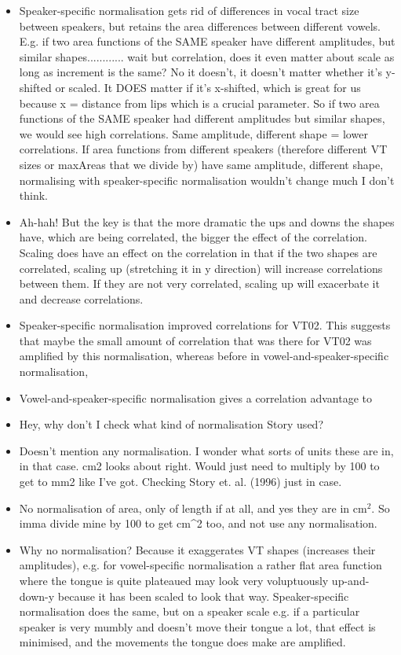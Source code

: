 \documentclass{article}
\begin{document}
\begin{itemize}
\begin{itemize}
\begin{itemize}
\begin{itemize}
                \item Speaker-specific normalisation gets rid of differences in vocal tract size between speakers, but retains the area differences between different vowels. E.g. if two area functions of the SAME speaker have different amplitudes, but similar shapes............ wait but correlation, does it even matter about scale as long as increment is the same? No it doesn't, it doesn't matter whether it's y-shifted or scaled. It DOES matter if it's x-shifted, which is great for us because x = distance from lips which is a crucial parameter. So if two area functions of the SAME speaker had different amplitudes but similar shapes, we would see high correlations. Same amplitude, different shape = lower correlations. If area functions from different speakers (therefore different VT sizes or maxAreas that we divide by) have same amplitude, different shape, normalising with speaker-specific normalisation wouldn't change much I don't think.
                \item Ah-hah! But the key is that the more dramatic the ups and downs the shapes have, which are being correlated, the bigger the effect of the correlation. Scaling does have an effect on the correlation in that if the two shapes are correlated, scaling up (stretching it in y direction) will increase correlations between them. If they are not very correlated, scaling up will exacerbate it and decrease correlations.
                \item Speaker-specific normalisation improved correlations for VT02. This suggests that maybe the small amount of correlation that was there for VT02 was amplified by this normalisation, whereas before in vowel-and-speaker-specific normalisation, 
                \item Vowel-and-speaker-specific normalisation gives a correlation advantage to 
                \item Hey, why don't I check what kind of normalisation Story used?
                \item Doesn't mention any normalisation. I wonder what sorts of units these are in, in that case. cm2 looks about right. Would just need to multiply by 100 to get to mm2 like I've got. Checking Story et. al. (1996) just in case. 
                \item No normalisation of area, only of length if at all, and yes they are in cm$^2$. So imma divide mine by 100 to get cm^2 too, and not use any normalisation.
                \item Why no normalisation? Because it exaggerates VT shapes (increases their amplitudes), e.g. for vowel-specific normalisation a rather flat area function where the tongue is quite plateaued may look very voluptuously up-and-down-y because it has been scaled to look that way. Speaker-specific normalisation does the same, but on a speaker scale e.g. if a particular speaker is very mumbly and doesn't move their tongue a lot, that effect is minimised, and the movements the tongue does make are amplified.

\end{itemize}
\end{itemize}
\end{itemize}
\end{itemize}
\end{document}
